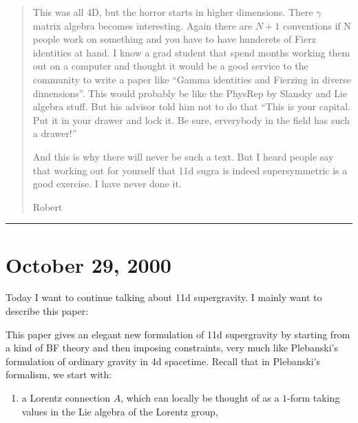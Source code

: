 \documentclass{article}
\def\tightlist{}
\renewcommand{\texttt}[1]{%
  \begingroup
  \ttfamily
  \begingroup\lccode`~=`/\lowercase{\endgroup\def~}{/\discretionary{}{}{}}%
  \begingroup\lccode`~=`[\lowercase{\endgroup\def~}{[\discretionary{}{}{}}%
  \begingroup\lccode`~=`.\lowercase{\endgroup\def~}{.\discretionary{}{}{}}%
  \catcode`/=\active\catcode`[=\active\catcode`.=\active
  \scantokens{#1\noexpand}%
  \endgroup
}
\begin{document}
\begin{quote}
This was all 4D, but the horror starts in higher dimensions. There
\(\gamma\) matrix algebra becomes interesting. Again there are \(N+1\)
conventions if N people work on something and you have to have hunderets
of Fierz identities at hand. I know a grad student that spend months
working them out on a computer and thought it would be a good service to
the community to write a paper like ``Gamma identities and Fierzing in
diverse dimensions''. This would probably be like the PhysRep by Slansky
and Lie algebra stuff. But his advisor told him not to do that ``This is
your capital. Put it in your drawer and lock it. Be sure, erverybody in
the field has such a drawer!''

And this is why there will never be such a text. But I heard people say
that working out for yourself that 11d sugra is indeed supersymmetric is
a good exercise. I have never done it.

Robert
\end{quote}

\begin{center}\rule{0.5\linewidth}{0.5pt}\end{center}



\hypertarget{week159}{%
\section{October 29, 2000}\label{week159}}

Today I want to continue talking about 11d supergravity. I mainly want
to describe this paper:


This paper gives an elegant new formulation of 11d supergravity by
starting from a kind of BF theory and then imposing constraints, very
much like Plebanski's formulation of ordinary gravity in 4d spacetime.
Recall that in Plebanski's formalism, we start with:

\begin{enumerate}
\def\labelenumi{\alph{enumi})}
\tightlist
\item
  a Lorentz connection \(A\), which can locally be thought of as a
  \(1\)-form taking values in the Lie algebra of the Lorentz group,
\end{enumerate}
\end{document}
